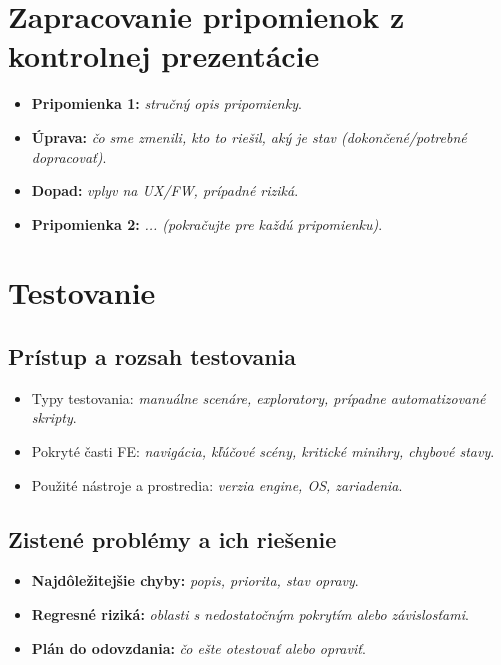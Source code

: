 \documentclass[12pt,a4paper]{article}
\begin{document}
\section{Zapracovanie pripomienok z kontrolnej prezentácie}
\begin{itemize}
    \item \textbf{Pripomienka 1:} \textit{stručný opis pripomienky}.
    \item \textbf{Úprava:} \textit{čo sme zmenili, kto to riešil, aký je stav (dokončené/potrebné dopracovať)}.
    \item \textbf{Dopad:} \textit{vplyv na UX/FW, prípadné riziká}.
    \item \textbf{Pripomienka 2:} \textit{... (pokračujte pre každú pripomienku)}.
\end{itemize}

\section{Testovanie}
\subsection{Prístup a rozsah testovania}
\begin{itemize}
    \item Typy testovania: \textit{manuálne scenáre, exploratory, prípadne automatizované skripty}.
    \item Pokryté časti FE: \textit{navigácia, kľúčové scény, kritické minihry, chybové stavy}.
    \item Použité nástroje a prostredia: \textit{verzia engine, OS, zariadenia}.
\end{itemize}


\subsection{Zistené problémy a ich riešenie}
\begin{itemize}
    \item \textbf{Najdôležitejšie chyby:} \textit{popis, priorita, stav opravy}.
    \item \textbf{Regresné riziká:} \textit{oblasti s nedostatočným pokrytím alebo závislosťami}.
    \item \textbf{Plán do odovzdania:} \textit{čo ešte otestovať alebo opraviť}.
\end{itemize}
\end{document}
